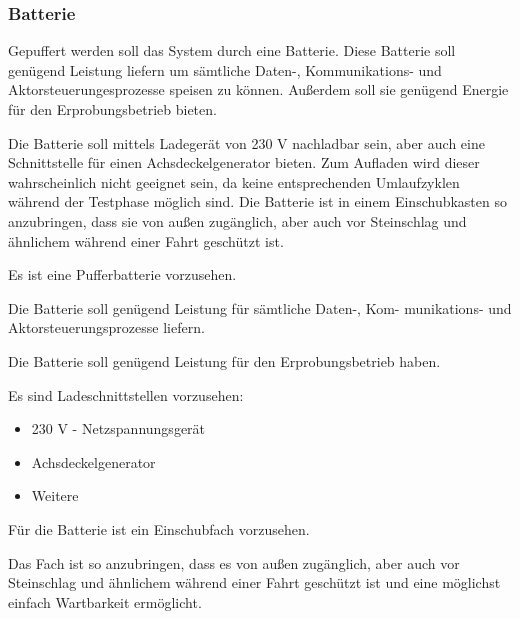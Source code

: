 \subsubsection{Batterie}
Gepuffert werden soll das System durch eine Batterie. Diese Batterie soll genügend Leistung liefern um sämtliche Daten-, Kommunikations- und Aktorsteuerungesprozesse speisen zu können. Außerdem soll sie genügend Energie für den Erprobungsbetrieb bieten.\par
Die Batterie soll mittels Ladegerät von 230 V nachladbar sein, aber auch eine Schnittstelle für einen Achsdeckelgenerator bieten. Zum Aufladen wird dieser wahrscheinlich nicht geeignet sein, da keine entsprechenden Umlaufzyklen während der Testphase möglich sind. %
Die Batterie ist in einem Einschubkasten so anzubringen, dass sie von außen zugänglich, aber auch vor Steinschlag und ähnlichem während einer Fahrt geschützt ist.\par
\begin{feat}
Es ist eine Pufferbatterie vorzusehen.
\end{feat}
\begin{rem}[zu Anf. 11]
Die Batterie soll genügend Leistung für sämtliche Daten-, Kom- munikations- und Aktorsteuerungsprozesse liefern.
\end{rem}
\begin{rem}[zu Anf. 11]
Die Batterie soll genügend Leistung für den Erprobungsbetrieb haben.
\end{rem}
\begin{rem}[zu Anf. 11]
Es sind Ladeschnittstellen vorzusehen:
\begin{itemize}
    \item 230 V - Netzspannungsgerät
    \item Achsdeckelgenerator
    \item Weitere
\end{itemize}
\end{rem}
\begin{feat}
Für die Batterie ist ein Einschubfach vorzusehen. 
\end{feat}
\begin{rem} [zu Anf. 12]
Das Fach ist so anzubringen, dass es von außen zugänglich, aber auch vor Steinschlag und ähnlichem während einer Fahrt geschützt ist und eine möglichst einfach Wartbarkeit ermöglicht.
\end{rem}
